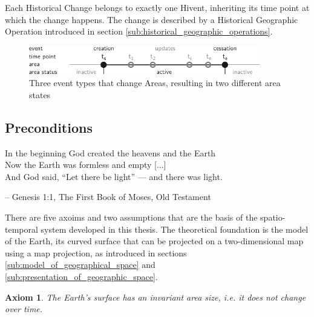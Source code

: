 Each Historical Change belongs to exactly one Hivent, inheriting its time point at which the change happens.  The change is described by a Historical Geographic Operation introduced in section \ref{sub:historical_geographic_operations}.

\begin{figure}[H]
  \vspace{1em}
  \centering
  \includegraphics[width=0.9\textwidth]{graphics/development/area_states}
  \caption{Three event types that change Areas, resulting in two different area states}
  \label{fig:area_states}
\end{figure}




\subsection{Preconditions} %
\label{sub:preconditions}

\begin{quoteit}
In the beginning God created the heavens and the Earth \\
Now the Earth was formless and empty [...] \\
And God said, “Let there be light” --- and there was light.
\end{quoteit}
\hfill -- Genesis 1:1, The First Book of Moses, Old Testament

There are five axoims and two assumptions that are the basis of the spatio-temporal system developed in this thesis. The theoretical foundation is the model of the Earth, its curved surface that can be projected on a two-dimensional map using a map projection, as introduced in sections \ref{sub:model_of_geographical_space} and \ref{sub:presentation_of_geographic_space}.

\vspace{-1.0em}
\newtheorem{invariant_surface}[assicounter]{Axiom}
\begin{invariant_surface}
\label{axm:invariant_surface}
  The Earth's surface has an invariant area size, i.e. it does not change over time.
\end{invariant_surface}

